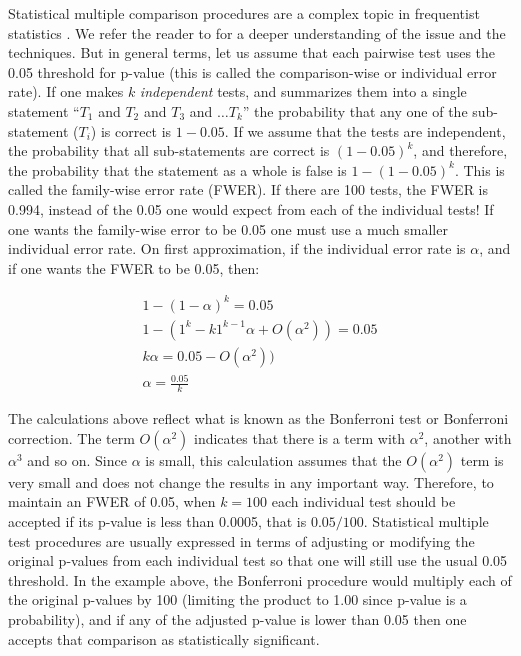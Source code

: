 \documentclass[twoside,11pt,preprint]{article}
\begin{document}
Statistical multiple comparison procedures are a complex topic in
frequentist statistics \citep{feise2002multiple, rothman1990no, bender2001adjusting}. We refer the reader to
\citep{farcomeni2008review, garcia2008extension} for a deeper
understanding of the issue and the techniques.
But in general terms, let us assume that each pairwise test uses the 0.05
threshold for p-value (this is called the
comparison-wise or individual error rate). If one makes \(k\)
\emph{independent} tests, and summarizes them into a single statement
``\(T_1\) and \(T_2\) and \(T_3\) and \(\ldots T_k\)'' the probability that any
one of the sub-statement (\(T_i\)) is correct is \(1-0.05\). If we assume
that the tests are independent, the probability that all
sub-statements are correct is \((1-0.05)^k\), and therefore, the
probability that the statement as a whole is false is \(1- (1-0.05)^k\).
This is called the family-wise error rate (FWER). If there are 100
tests, the FWER is 0.994, instead of the 0.05 one would expect from
each of the individual tests! If one wants the family-wise error to
be 0.05 one must use a much smaller individual error rate. On first
approximation, if the individual error rate is \(\alpha\), and if one wants the FWER to be 0.05, then:

\begin{align*}
1- (1-\alpha)^k  = 0.05\\
1 - (1^k -k 1^{k-1} \alpha + O(\alpha^2)) = 0.05\\
k \alpha = 0.05 - O(\alpha^2))\\
\alpha = \frac{0.05}{k}
\end{align*}

The calculations above reflect what is known as the Bonferroni test or Bonferroni
correction. The term \(O(\alpha^2)\) indicates that there is a term
with \(\alpha^2\), another with \(\alpha^3\) and so
on. Since \(\alpha\) is small, this calculation assumes that the
\(O(\alpha^2)\) term is very small and does not change the results in
any important way. Therefore, to maintain an FWER of 0.05, when
\(k=100\) each individual test should be accepted if its p-value is less
than 0.0005, that is \(0.05/100\). Statistical multiple test procedures
are usually expressed in terms of adjusting or modifying the original
p-values from each individual test so that one will still use the usual
0.05 threshold. In the example above, the Bonferroni procedure would
multiply each of the original p-values by 100 (limiting the product to
1.00 since p-value is a probability), and if any of the adjusted p-value
is lower than 0.05 then one accepts that comparison as statistically
significant.
\end{document}
